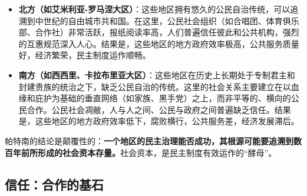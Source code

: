 \begin{itemize}
    \item \textbf{北方（如艾米利亚-罗马涅大区）}：这些地区拥有悠久的公民自治传统，可以追溯到中世纪的自由城市共和国。在这里，公民社会组织（如合唱团、体育俱乐部、合作社）非常活跃，报纸阅读率高，人们普遍信任彼此和公共机构，强烈的互惠规范深入人心。结果是，这些地区的地方政府效率极高，公共服务质量好，经济繁荣，民主制度运作顺畅。
    \item \textbf{南方（如西西里、卡拉布里亚大区）}：这些地区在历史上长期处于专制君主和封建贵族的统治之下，缺乏公民自治的传统。这里的社会关系主要建立在以血缘和庇护为基础的垂直网络（如家族、黑手党）之上，而非平等的、横向的公民合作。公民社会凋敝，人与人之间、公民与政府之间普遍缺乏信任。结果是，这些地区的地方政府效率低下，腐败横行，公共服务差，经济发展滞后。
\end{itemize}

帕特南的结论是颠覆性的：\textbf{一个地区的民主治理能否成功，其根源可能要追溯到数百年前所形成的社会资本存量。}社会资本，是民主制度有效运作的“酵母”。

\subsection{信任：合作的基石}

